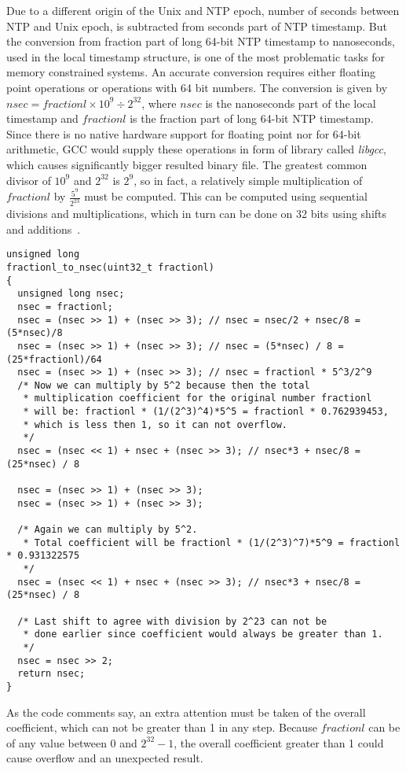 Due to a different origin of the Unix and NTP epoch,
number of seconds between NTP and Unix epoch,
is subtracted from seconds part of NTP timestamp.
But the conversion from fraction part of long 64-bit NTP timestamp to nanoseconds,
used in the local timestamp structure,
is one of the most problematic tasks for memory constrained systems.
An accurate conversion requires either floating point operations or operations with 64 bit numbers.
The conversion is given by
$nsec = fractionl \times 10^9 \div 2^{32}$, where $nsec$ is the nanoseconds part of the local timestamp
and $fractionl$ is the fraction part of long 64-bit NTP timestamp.
Since there is no native hardware support for floating point nor for 64-bit arithmetic,
GCC would supply these operations in form of library called {\it{libgcc}},
which causes significantly bigger resulted binary file.
The greatest common divisor of $10^9$ and $2^{32}$ is $2^9$,
so in fact, a relatively simple multiplication of $fractionl$ by $\frac{5^9}{2^{23}}$ must be computed.
This can be computed using sequential divisions and multiplications,
which in turn can be done on 32 bits using shifts and additions~\cite{c99}.
\begin{lstlisting}[caption=Conversion from NTP fraction part to nanoseconds]
unsigned long
fractionl_to_nsec(uint32_t fractionl)
{
  unsigned long nsec;
  nsec = fractionl;
  nsec = (nsec >> 1) + (nsec >> 3); // nsec = nsec/2 + nsec/8 = (5*nsec)/8
  nsec = (nsec >> 1) + (nsec >> 3); // nsec = (5*nsec) / 8 = (25*fractionl)/64
  nsec = (nsec >> 1) + (nsec >> 3); // nsec = fractionl * 5^3/2^9
  /* Now we can multiply by 5^2 because then the total
   * multiplication coefficient for the original number fractionl
   * will be: fractionl * (1/(2^3)^4)*5^5 = fractionl * 0.762939453,
   * which is less then 1, so it can not overflow.
   */
  nsec = (nsec << 1) + nsec + (nsec >> 3); // nsec*3 + nsec/8 = (25*nsec) / 8

  nsec = (nsec >> 1) + (nsec >> 3);
  nsec = (nsec >> 1) + (nsec >> 3);

  /* Again we can multiply by 5^2.
   * Total coefficient will be fractionl * (1/(2^3)^7)*5^9 = fractionl * 0.931322575
   */
  nsec = (nsec << 1) + nsec + (nsec >> 3); // nsec*3 + nsec/8 = (25*nsec) / 8

  /* Last shift to agree with division by 2^23 can not be
   * done earlier since coefficient would always be greater than 1.
   */
  nsec = nsec >> 2;
  return nsec;
}
\end{lstlisting}
As the code comments say, an extra attention must be taken of the overall coefficient,
which can not be greater than 1 in any step.
Because $fractionl$ can be of any value between $0$ and $2^{32}-1$,
the overall coefficient greater than 1 could cause overflow and an unexpected result.

